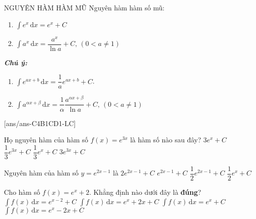 \begin{dang}{NGUYÊN HÀM HÀM MŨ}
Nguyên hàm hàm số mũ:
\begin{enumerate}[$\bullet$]
\item  $\displaystyle\int e^x \mathrm{\,d}x=e^x+C$  
\item  $\displaystyle\int a^x \mathrm{\,d}x=\dfrac{a^x}{\ln a}+C,\,(0<a\ne 1)$  
\end{enumerate}
\textbf{\textit{Chú ý:}}
\begin{enumerate}[$\bullet$]
\item $\displaystyle\int e^{ax+b} \mathrm{\,d}x=\dfrac{1}{a}e^{ax+b}+C$. 
\item  $\displaystyle\int a^{\alpha x+\beta} \mathrm{\,d}x=\dfrac{1}{\alpha}\dfrac{a^{\alpha x+\beta}}{\ln a}+C,\,(0<a\ne 1)$   
\end{enumerate}

\end{dang}
[ans/ans-C4B1CD1-LC]
\TN
\begin{ex}%
Họ nguyên hàm của hàm số $f(x)=e^{3x}$ là hàm số nào sau đây?
\choice
{$3e^x+C$}
{\True $\dfrac{1}{3}e^{3x}+C$}
{$\dfrac{1}{3}e^{x}+C$}
{$3e^{3x}+C$}
\end{ex}

\begin{ex}%
Nguyên hàm của hàm số $y=e^{2x-1}$  là
\choice
{$2e^{2x-1}+C$}
{$e^{2x-1}+C$}
{\True $\dfrac{1}{2}e^{2x-1}+C$}
{$\dfrac{1}{2}e^{x}+C$}
\end{ex}

\begin{ex}%
Cho hàm số $f(x)=e^x+2$. Khẳng định nào dưới đây là \textbf{đúng}?
\choice
{$\displaystyle\int f(x) \mathrm{\,d}x=e^{x-2}+C$}
{\True $\displaystyle\int f(x) \mathrm{\,d}x=e^{x}+2x+C$}
{$\displaystyle\int f(x) \mathrm{\,d}x=e^{x}+C$}
{$\displaystyle\int f(x) \mathrm{\,d}x=e^{x}-2x+C$}
\end{ex}

